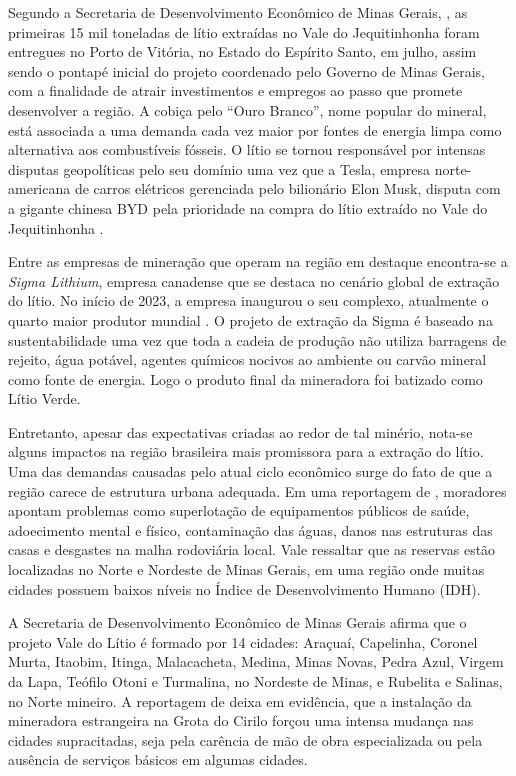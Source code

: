 Segundo a Secretaria de Desenvolvimento Econômico de Minas Gerais, , as primeiras 15 mil toneladas de lítio extraídas no Vale do Jequitinhonha foram entregues no Porto de Vitória, no Estado do Espírito Santo, em julho, assim sendo o pontapé inicial do projeto coordenado pelo Governo de Minas Gerais, com a finalidade de atrair investimentos e empregos ao passo que promete desenvolver a região. A cobiça pelo ``Ouro Branco'', nome popular do mineral, está associada a uma demanda cada vez maior por fontes de energia limpa como alternativa aos combustíveis fósseis. O lítio se tornou responsável por intensas disputas geopolíticas pelo seu domínio uma vez que a Tesla, empresa norte-americana de carros elétricos gerenciada pelo bilionário Elon Musk, disputa com a gigante chinesa BYD pela prioridade na compra do lítio extraído no Vale do Jequitinhonha .

Entre as empresas de mineração que operam na região em destaque encontra-se a \textit{Sigma Lithium}, empresa canadense que se destaca no cenário global de extração do lítio. No início de 2023, a empresa inaugurou o seu complexo, atualmente o quarto maior produtor mundial . O projeto de extração da Sigma é baseado na sustentabilidade uma vez que toda a cadeia de produção não utiliza barragens de rejeito, água potável, agentes químicos nocivos ao ambiente ou carvão mineral como fonte de energia. Logo o produto final da mineradora foi batizado como Lítio Verde.

Entretanto, apesar das expectativas criadas ao redor de tal minério, nota-se alguns impactos na região brasileira mais promissora para a extração do lítio. Uma das demandas causadas pelo atual ciclo econômico surge do fato de que a região carece de estrutura urbana adequada. Em uma reportagem de , moradores apontam problemas como superlotação de equipamentos públicos de saúde, adoecimento mental e físico, contaminação das águas, danos nas estruturas das casas e desgastes na malha rodoviária local. Vale ressaltar que as reservas estão localizadas no Norte e Nordeste de Minas Gerais, em uma região onde muitas cidades possuem baixos níveis no Índice de Desenvolvimento Humano (IDH).

A Secretaria de Desenvolvimento Econômico de Minas Gerais afirma que o projeto Vale do Lítio é formado por 14 cidades: Araçuaí, Capelinha, Coronel Murta, Itaobim, Itinga, Malacacheta, Medina, Minas Novas, Pedra Azul, Virgem da Lapa, Teófilo Otoni e Turmalina, no Nordeste de Minas, e Rubelita e Salinas, no Norte mineiro. A reportagem de  deixa em evidência, que a instalação da mineradora estrangeira na Grota do Cirilo forçou uma intensa mudança nas cidades supracitadas, seja pela carência de mão de obra especializada ou pela ausência de serviços básicos em algumas cidades.

